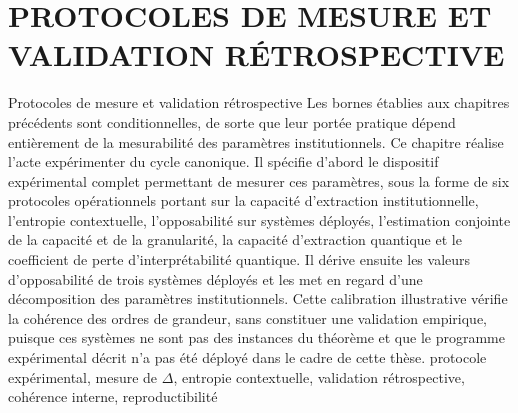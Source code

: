 \documentclass[a4paper,11pt,reqno,oneside]{memoir}
\begin{document}
\chapter[PROTOCOLES DE MESURE ET VALIDATION R\'ETROSPECTIVE]%
        {PROTOCOLES DE MESURE ET VALIDATION R\'ETROSPECTIVE}
\label{chap:experimentation}
\debutChapitre%
  {Protocoles de mesure et validation r\'etrospective}%
  {%
    Les bornes \'etablies aux chapitres pr\'ec\'edents sont conditionnelles,
    de sorte que leur port\'ee pratique d\'epend enti\`erement de la mesurabilit\'e des
    param\`etres institutionnels. Ce chapitre r\'ealise l'acte exp\'erimenter du
    cycle canonique. Il sp\'ecifie d'abord le dispositif exp\'erimental complet
    permettant de mesurer ces param\`etres, sous la forme de six protocoles
    op\'erationnels portant sur la capacit\'e d'extraction institutionnelle,
    l'entropie contextuelle, l'opposabilit\'e sur syst\`emes d\'eploy\'es,
    l'estimation conjointe de la capacit\'e et de la granularit\'e, la capacit\'e
    d'extraction quantique et le coefficient de perte d'interpr\'etabilit\'e quantique. Il
    d\'erive ensuite les valeurs d'opposabilit\'e de trois syst\`emes
    d\'eploy\'es et les met en regard d'une d\'ecomposition des param\`etres
    institutionnels. Cette calibration illustrative v\'erifie la coh\'erence des ordres de
    grandeur, sans constituer une validation empirique, puisque ces
    syst\`emes ne sont pas des instances du th\'eor\`eme et que le programme
    exp\'erimental d\'ecrit n'a pas \'et\'e d\'eploy\'e dans le cadre de cette th\`ese.%
  }%
  {%
    protocole exp\'erimental, mesure de $\Delta$, entropie contextuelle,
    validation r\'etrospective, coh\'erence interne, reproductibilit\'e%
  }%







\end{document}
